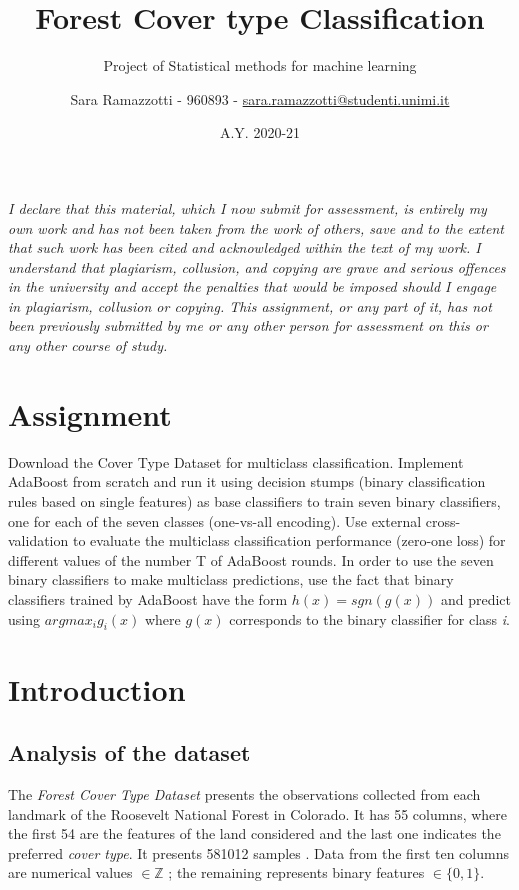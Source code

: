 \documentclass{scrartcl}
\title{Forest Cover type Classification}
\subtitle{Project of Statistical methods for machine learning}
\author{Sara Ramazzotti - 960893 - \href{mailto:sara.ramazzotti@studenti.unimi.it}
{sara.ramazzotti@studenti.unimi.it}}
\date{A.Y. 2020-21}
\begin{document}
\maketitle

\textit{I declare that this material, which I now submit for assessment, is entirely my own work and has not been taken from the work of others, save and to the extent that such work has been cited and acknowledged within the text of my work. I understand that plagiarism, collusion, and copying are grave and serious offences in the university and accept the penalties that would be imposed should I engage in plagiarism, collusion or copying. This assignment, or any part of it, has not been previously submitted by me or any other person for assessment on this or any other course of study.}

\section{Assignment}
Download the Cover Type Dataset \cite{fctd} for multiclass classification. Implement AdaBoost from scratch and run it using decision stumps (binary classification rules based on single features) as base classifiers to train seven binary classifiers, one for each of the seven classes (one-vs-all encoding). Use external cross-validation to evaluate the multiclass classification performance (zero-one loss) for different values of the number T of AdaBoost rounds. In order to use the seven binary classifiers to make multiclass predictions, use the fact that binary classifiers trained by AdaBoost have the form $ h(x)=sgn(g(x)) $ and predict using $ argmax_{i}g_{i}(x) $ where $ g(x) $ corresponds to the binary classifier for class \textit{i}.

\section{Introduction}

\subsection{Analysis of the dataset}
The \textit{Forest Cover Type Dataset} presents the observations collected from each landmark of the Roosevelt National Forest in Colorado. It has 55 columns, where the first 54 are the features of the land considered and the last one indicates the preferred \textit{cover type}. It presents 581012 samples \cite{fctd}.
Data from the first ten columns are numerical values $ \in \mathbb{Z} $ ; the remaining represents binary features $ \in \{0, 1\}$.
\end{document}
